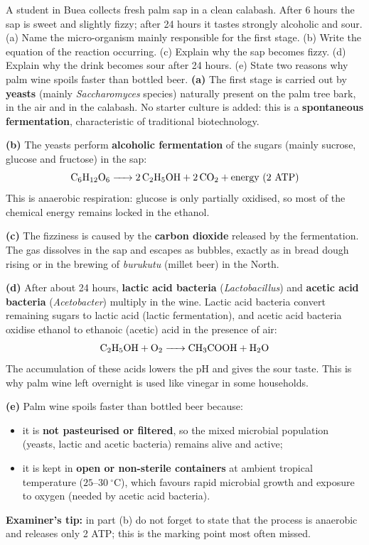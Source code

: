 \documentclass[11pt]{article}
\begin{document}
\begin{exoresolu}
A student in Buea collects fresh palm sap in a clean calabash. After 6 hours the sap is sweet and slightly fizzy; after 24 hours it tastes strongly alcoholic and sour. (a) Name the micro-organism mainly responsible for the first stage. (b) Write the equation of the reaction occurring. (c) Explain why the sap becomes fizzy. (d) Explain why the drink becomes sour after 24 hours. (e) State two reasons why palm wine spoils faster than bottled beer.
\tcblower
\textbf{(a)} The first stage is carried out by \textbf{yeasts} (mainly \emph{Saccharomyces} species) naturally present on the palm tree bark, in the air and in the calabash. No starter culture is added: this is a \textbf{spontaneous fermentation}, characteristic of traditional biotechnology.

\textbf{(b)} The yeasts perform \textbf{alcoholic fermentation} of the sugars (mainly sucrose, glucose and fructose) in the sap:
\[ \ce{C6H12O6 -> 2 C2H5OH + 2 CO2} + \text{energy (2 ATP)} \]
This is anaerobic respiration: glucose is only partially oxidised, so most of the chemical energy remains locked in the ethanol.

\textbf{(c)} The fizziness is caused by the \textbf{carbon dioxide} released by the fermentation. The gas dissolves in the sap and escapes as bubbles, exactly as in bread dough rising or in the brewing of \emph{burukutu} (millet beer) in the North.

\textbf{(d)} After about 24 hours, \textbf{lactic acid bacteria} (\emph{Lactobacillus}) and \textbf{acetic acid bacteria} (\emph{Acetobacter}) multiply in the wine. Lactic acid bacteria convert remaining sugars to lactic acid (lactic fermentation), and acetic acid bacteria oxidise ethanol to ethanoic (acetic) acid in the presence of air:
\[ \ce{C2H5OH + O2 -> CH3COOH + H2O} \]
The accumulation of these acids lowers the pH and gives the sour taste. This is why palm wine left overnight is used like vinegar in some households.

\textbf{(e)} Palm wine spoils faster than bottled beer because:
\begin{itemize}
\item it is \textbf{not pasteurised or filtered}, so the mixed microbial population (yeasts, lactic and acetic bacteria) remains alive and active;
\item it is kept in \textbf{open or non-sterile containers} at ambient tropical temperature ($25$--$30\ ^\circ\mathrm{C}$), which favours rapid microbial growth and exposure to oxygen (needed by acetic acid bacteria).
\end{itemize}
\textbf{Examiner's tip:} in part (b) do not forget to state that the process is anaerobic and releases only 2 ATP; this is the marking point most often missed.
\end{exoresolu}
\end{document}
